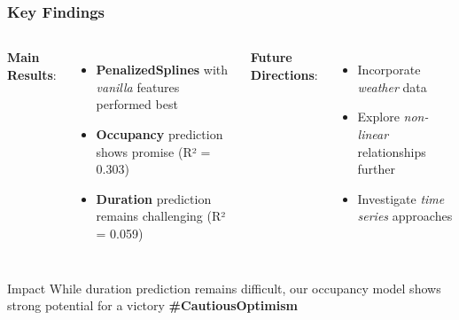 \documentclass{beamer}
\begin{document}
\begin{frame}
\frametitle{Key Findings}
    \begin{columns}
        \textbf{Main Results}:
            \begin{itemize}
                \item \textbf{PenalizedSplines} with \textit{vanilla} features performed best
                \item \textbf{Occupancy} prediction shows promise (R² = 0.303)
                \item \textbf{Duration} prediction remains challenging (R² = 0.059)
            \end{itemize}
                            
        \textbf{Future Directions}:
            \begin{itemize}
            \item Incorporate \textit{weather} data
            \item Explore \textit{non-linear} relationships further
            \item Investigate \textit{time series} approaches
            \end{itemize}
    \end{columns}

    \vspace{0.5cm}
    \begin{alertblock}{Impact}
        While duration prediction remains difficult, our occupancy model shows strong potential for a victory \textbf{\#CautiousOptimism}
    \end{alertblock}
\end{frame}
\end{document}

